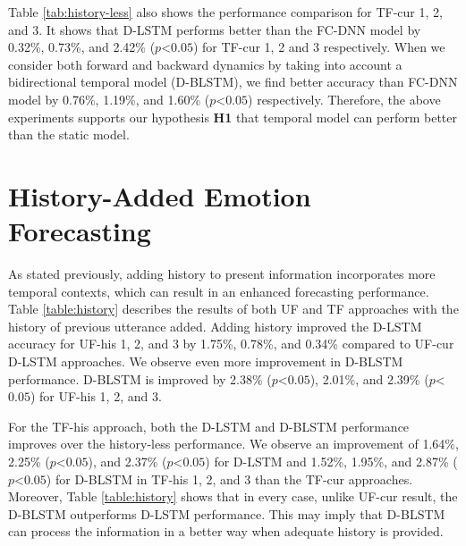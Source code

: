  Table \ref{tab:history-less} also shows the performance comparison for TF-cur 1, 2, and 3. It shows that D-LSTM performs better than the FC-DNN model by  0.32\%, 0.73\%, and 2.42\% ($p$\textless$0.05$) for TF-cur 1, 2 and 3 respectively. When we consider both forward and backward dynamics by taking into account a bidirectional temporal model (D-BLSTM), we find better accuracy than FC-DNN model by 0.76\%, 1.19\%, and 1.60\% ($p$\textless$0.05$) respectively.  Therefore, the above experiments supports our hypothesis \textbf{H1} that temporal model can perform better than the static model.




\section{History-Added Emotion Forecasting}
As stated previously, adding history to present information incorporates more temporal contexts, which can result in an enhanced forecasting performance. Table \ref{table:history} describes the results of both UF and TF approaches with the history of previous utterance added.  Adding history improved the D-LSTM accuracy for UF-his 1, 2, and 3 by 1.75\%, 0.78\%, and 0.34\% compared to UF-cur D-LSTM approaches. We observe even more improvement in D-BLSTM performance. D-BLSTM  is improved by 2.38\% ($p$\textless$0.05$), 2.01\%, and 2.39\% ($p$\textless$0.05$) for UF-his 1, 2, and 3. 

For the TF-his approach, both the D-LSTM and D-BLSTM performance improves over the history-less performance. We observe an  improvement of 1.64\%, 2.25\% ($p$\textless$0.05$), and 2.37\% ($p$\textless$0.05$) for D-LSTM and 1.52\%, 1.95\%, and 2.87\% ($p$\textless$0.05$) for D-BLSTM in TF-his 1, 2, and 3 than the TF-cur approaches. Moreover, Table \ref{table:history} shows that in every case, unlike UF-cur result, the D-BLSTM outperforms D-LSTM performance. This may imply that D-BLSTM can process the information in a better way when adequate history is provided. 

